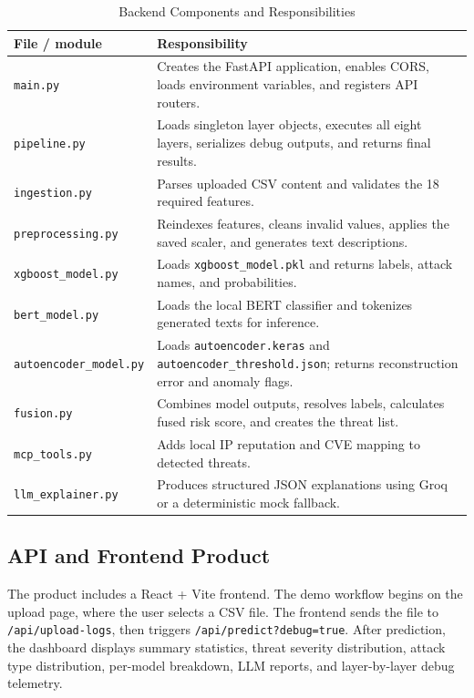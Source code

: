 \documentclass[12pt,a4paper]{article}
\begin{document}
\begin{table}[H]
\centering
\caption{Backend Components and Responsibilities}
\label{tab:backend_components}
\small
\begin{tabularx}{\linewidth}{l X}
\toprule
File / module & Responsibility \\
\midrule
\texttt{main.py} & Creates the FastAPI application, enables CORS, loads environment variables, and registers API routers. \\
\texttt{pipeline.py} & Loads singleton layer objects, executes all eight layers, serializes debug outputs, and returns final results. \\
\texttt{ingestion.py} & Parses uploaded CSV content and validates the 18 required features. \\
\texttt{preprocessing.py} & Reindexes features, cleans invalid values, applies the saved scaler, and generates text descriptions. \\
\texttt{xgboost\_model.py} & Loads \texttt{xgboost\_model.pkl} and returns labels, attack names, and probabilities. \\
\texttt{bert\_model.py} & Loads the local BERT classifier and tokenizes generated texts for inference. \\
\texttt{autoencoder\_model.py} & Loads \texttt{autoencoder.keras} and \texttt{autoencoder\_threshold.json}; returns reconstruction error and anomaly flags. \\
\texttt{fusion.py} & Combines model outputs, resolves labels, calculates fused risk score, and creates the threat list. \\
\texttt{mcp\_tools.py} & Adds local IP reputation and CVE mapping to detected threats. \\
\texttt{llm\_explainer.py} & Produces structured JSON explanations using Groq or a deterministic mock fallback. \\
\bottomrule
\end{tabularx}
\end{table}

\subsection{API and Frontend Product}

The product includes a React + Vite frontend. The demo workflow begins on the upload page, where the user selects a CSV file. The frontend sends the file to \texttt{/api/upload-logs}, then triggers \texttt{/api/predict?debug=true}. After prediction, the dashboard displays summary statistics, threat severity distribution, attack type distribution, per-model breakdown, LLM reports, and layer-by-layer debug telemetry.
\end{document}

